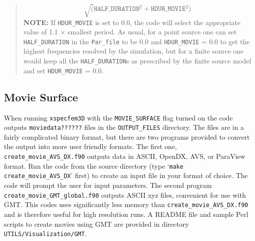 \documentclass[oneside,english]{book}
\begin{document}
\begin{quote}
\[
\sqrt{(}\mathrm{\mathtt{HALF\_DURATIO}\mathtt{N}^{2}}+\mathrm{\mathtt{HDUR\_MOVI}\mathtt{E}^{2}})\]
\textbf{NOTE:} If \texttt{HDUR\_MOVIE} is set to 0.0, the code will
select the appropriate value of 1.1 $\times$ smallest period. As
usual, for a point source one can set \texttt{HALF\_DURATION} in the
\texttt{Par\_file} to be 0.0 and \texttt{HDUR\_MOVIE} = 0.0 to get
the highest frequencies resolved by the simulation, but for a finite
source one would keep all the \texttt{HALF\_DURATION}s as prescribed
by the finite source model and set \texttt{HDUR\_MOVIE} = 0.0.
\end{quote}

\subsection{Movie Surface}

When running \texttt{xspecfem3D} with the \texttt{MOVIE\_SURFACE}
flag turned on the code outputs \texttt{moviedata??????} files in
the \texttt{OUTPUT\_FILES} directory. The files are in a fairly complicated
binary format, but there are two programs provided to convert the
output into more user friendly formats. The first one, \texttt{create\_movie\_AVS\_DX.f90}
outputs data in ASCII, OpenDX, AVS, or ParaView format. Run the code
from the source directory (type `\texttt{make} \texttt{create\_movie\_AVS\_DX}'
first) to create an input file in your format of choice. The code
will prompt the user for input parameters. The second program \texttt{create\_movie\_GMT\_global.f90}
outputs ASCII xyz files, convenient for use with GMT. This codes uses
significantly less memory than \texttt{create\_movie\_AVS\_DX.f90}
and is therefore useful for high resolution runs.
A README file and sample Perl scripts to create movies using GMT are provided in directory
\texttt{UTILS/Visualization/GMT}.
\end{document}
